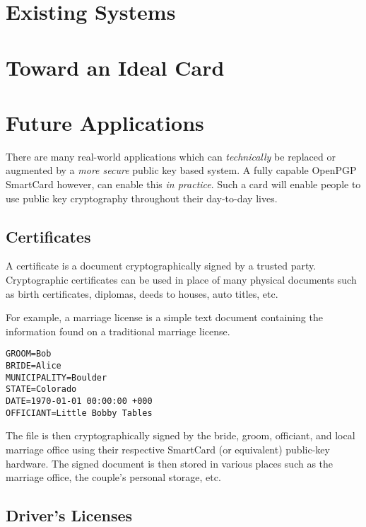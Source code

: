 \documentclass[11pt, twocolumn]{article}
\begin{document}
\section{Existing Systems}
\label{sec:exisitng}

\section{Toward an Ideal Card}
\label{sec:ideal}

\section{Future Applications}
\label{sec:future}

There are many real-world applications which can \textit{technically} be
replaced or augmented by a \textit{more secure} public key based system. A fully
capable OpenPGP SmartCard however, can enable this \textit{in practice}. Such a
card will enable people to use public key cryptography throughout their
day-to-day lives.

\subsection{Certificates}

A certificate is a document cryptographically signed by a trusted party.
Cryptographic certificates can be used in place of many physical documents such
as birth certificates, diplomas, deeds to houses, auto titles, etc.

For example, a marriage license is a simple text document containing the
information found on a traditional marriage license.

\begin{verbatim}
GROOM=Bob
BRIDE=Alice
MUNICIPALITY=Boulder
STATE=Colorado
DATE=1970-01-01 00:00:00 +000
OFFICIANT=Little Bobby Tables
\end{verbatim}

The file is then cryptographically signed by the bride, groom, officiant, and
local marriage office using their respective SmartCard (or equivalent)
public-key hardware. The signed document is then stored in various places such
as the marriage office, the couple's personal storage, etc.

\subsection{Driver's Licenses}
\end{document}
